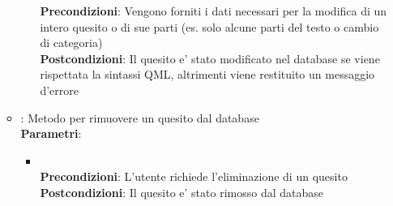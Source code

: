 \begin{itemize}
\begin{itemize}
\begin{itemize}
				\textbf{Precondizioni}: Vengono forniti i dati necessari per la modifica di un intero quesito o di sue parti (es. solo alcune parti del testo o cambio di categoria)\\
				\textbf{Postcondizioni}: Il quesito e' stato modificato nel database se viene rispettata la sintassi QML, altrimenti viene restituito un messaggio d'errore\\
			\end{itemize}
		\item{} : Metodo per rimuovere un quesito dal database\\
		\textbf{Parametri}:
			\begin{itemize}
				\item{}\\
				\textbf{Precondizioni}: L'utente richiede l'eliminazione di un quesito\\
				\textbf{Postcondizioni}: Il quesito e' stato rimosso dal database\\
			\end{itemize}
	\end{itemize}
\end{itemize}
\newpage


